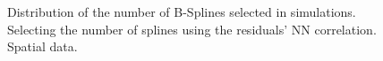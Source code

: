 \documentclass[
]{article}
\begin{document}
\begin{figure}

\begin{minipage}[t]{0.50\linewidth}

{\centering 


}

\end{minipage}%
%
\begin{minipage}[t]{0.50\linewidth}

{\centering 


}

\end{minipage}%

\caption{\label{fig-splines-nn-vd-spa}Distribution of the number of
B-Splines selected in simulations. Selecting the number of splines using
the residuals' NN correlation. Spatial data.}

\end{figure}
\newpage
\hypertarget{tbl-vd-bic}{}
\end{document}
